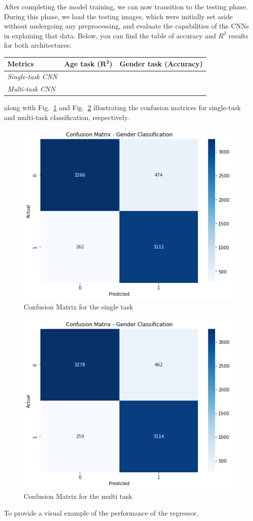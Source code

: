 After completing the model training, we can now transition to the testing
phase. During this phase, we load the testing images, which were initially
set aside without undergoing any preprocessing, and evaluate
the capabilities of the CNNs in explaining that data.
Below, you can find the table of accuracy and $R^2$ results for both
architectures:
\begin{table}[H]
    \centering
    \begin{tabular}{@{}lll@{}}
    \toprule
    Metrics & \textbf{Age task ($\mathbf{R^2}$)} & \textbf{Gender task (Accuracy)} \\ \midrule
    \textit{Single-task CNN} &                   &                      \\
    \textit{Multi-task CNN}  &                   &                      \\ \bottomrule
    \end{tabular}
\end{table}
along with Fig.~\ref{6mat} and Fig.~\ref{7mat} illustrating the
confusion matrices for single-task
and multi-task classification, respectively.
\begin{figure}[htbp]
    \centerline{\includegraphics[width=.4\textwidth]{images/testing/mat_single.png}}
    \caption{Confusion Matrix for the single task}
    \label{6mat}
\end{figure}
\begin{figure}[htbp]
    \centerline{\includegraphics[width=.4\textwidth]{images/testing/mat_multi.png}}
    \caption{Confusion Matrix for the multi task}
    \label{7mat}
\end{figure}
To provide a visual example of the performance of the regressor,
